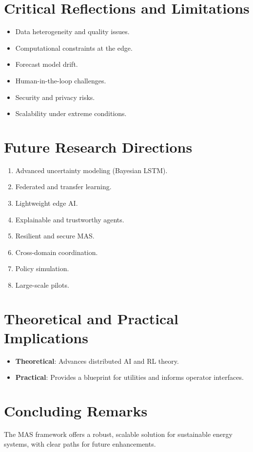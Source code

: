 \documentclass[12pt, a4paper, oneside]{book}
\begin{document}
\section{Critical Reflections and Limitations}
\begin{itemize}
    \item Data heterogeneity and quality issues.
    \item Computational constraints at the edge.
    \item Forecast model drift.
    \item Human-in-the-loop challenges.
    \item Security and privacy risks.
    \item Scalability under extreme conditions.
\end{itemize}

\section{Future Research Directions}
\begin{enumerate}
    \item Advanced uncertainty modeling (Bayesian LSTM).
    \item Federated and transfer learning.
    \item Lightweight edge AI.
    \item Explainable and trustworthy agents.
    \item Resilient and secure MAS.
    \item Cross-domain coordination.
    \item Policy simulation.
    \item Large-scale pilots.
\end{enumerate}

\section{Theoretical and Practical Implications}
\begin{itemize}
    \item \textbf{Theoretical}: Advances distributed AI and RL theory.
    \item \textbf{Practical}: Provides a blueprint for utilities and informs operator interfaces.
\end{itemize}

\section{Concluding Remarks}
The MAS framework offers a robust, scalable solution for sustainable energy systems, with clear paths for future enhancements.
\end{document}
